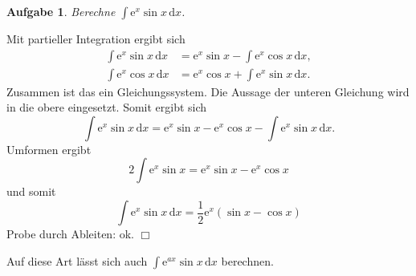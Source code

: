 \documentclass[a4paper,10pt,fleqn,twoside]{scrartcl}
\numberwithin{equation}{section}
\newcommand{\ee}{\mathrm e}
\newcommand{\strong}[1]{{\normalfont\sffamily\bfseries #1}}
\theoremstyle{Aufgabe}
\newtheorem{Aufgabe}{\sffamily Aufgabe}[section]
\begin{document}
\begin{Aufgabe}
Berechne $\displaystyle\int\ee^x\sin x\,\mathrm dx$.
\end{Aufgabe}

\noindent\strong{Lösung.}
Mit partieller Integration ergibt sich
\begin{align}
\int \ee^x\sin x\,\mathrm dx &= \ee^x\sin x - \int \ee^x\cos x\,\mathrm dx,\\
\int \ee^x\cos x\,\mathrm dx &= \ee^x\cos x + \int \ee^x\sin x\,\mathrm dx.
\end{align}
Zusammen ist das ein Gleichungssystem. Die Aussage der unteren
Gleichung wird in die obere eingesetzt. Somit ergibt sich
\begin{equation}
\int \ee^x\sin x\,\mathrm dx = \ee^x\sin x - \ee^x\cos x - \int \ee^x\sin x\,\mathrm dx.
\end{equation}
Umformen ergibt
\begin{equation}
2\int \ee^x\sin x = \ee^x\sin x-\ee^x\cos x
\end{equation}
und somit
\begin{equation}
\int \ee^x\sin x\,\mathrm dx = \frac{1}{2}\ee^x(\sin x-\cos x)
\end{equation}
Probe durch Ableiten: ok. $\Box$

Auf diese Art lässt sich auch $\displaystyle\int \ee^{ax}\sin x\,\mathrm dx$
berechnen.
\end{document}
